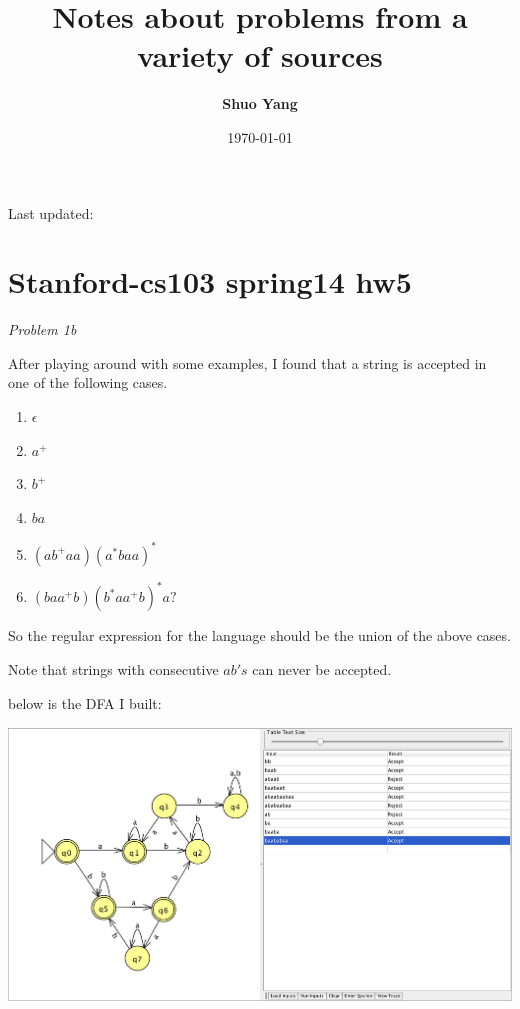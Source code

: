 \documentclass[11pt]{article}
\title{\bf Notes about problems from a variety of sources}
\author{\bf Shuo Yang}
\begin{document}
\maketitle

\begin{center}
Last updated: \date{\today}
\end{center}

\section*{\bf Stanford-cs103 spring14 hw5}

\emph{Problem 1b}

After playing around with some examples, I found that a string is
accepted in one of the following cases.

\begin{enumerate}
\item $\epsilon$
\item $a^+$
\item $b^+$
\item $ba$
\item $(ab^+aa)(a^*baa)^*$
\item $(baa^+b)(b^*aa^+b)^*a?$
\end{enumerate}


So the regular expression for the language should be the union of the
above cases.

Note that strings with consecutive $ab's$ can never be accepted.

below is the DFA I built:\\

\includegraphics[width=15cm,height=8cm]{../imgs/dfa-stanford-cs103-spring14-hw5-1b.png}
\end{document}
